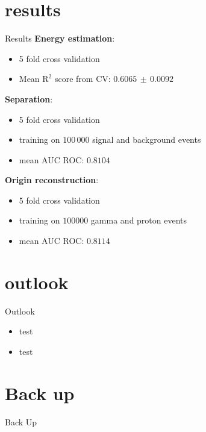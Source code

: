 \section{results}

\begin{frame}[t]{Results}
\textbf{{\color{tugreen} Energy estimation}}:
\begin{itemize}
    \item 5 fold cross validation
    \item Mean $\text{R}^2$ score from CV: $0.6065\,\pm\,0.0092$
\end{itemize}
\textbf{{\color{tugreen} Separation}}:
\begin{itemize}
    \item 5 fold cross validation
    \item training on $100\,000$ signal and background events
    \item mean AUC ROC: $0.8104$
\end{itemize}
\textbf{{\color{tugreen} Origin reconstruction}}:
\begin{itemize}
    \item 5 fold cross validation
    \item training on $100000$ gamma and proton events
    \item mean AUC ROC: $0.8114$
\end{itemize}
\end{frame}

\section{outlook}

\begin{frame}[t]{Outlook}
\begin{itemize}
    \item test
    \item test
\end{itemize}
\end{frame}


\section{Back up}
\appendix

\begin{frame}[t]{}
  \centering
  \textcolor{tugreen}{\Huge{Back Up}}
\end{frame}


